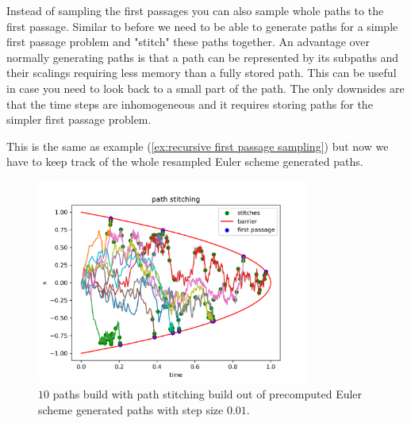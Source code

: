 \documentclass[a4paper,12pt]{article}
\begin{document}
\begin{technique}
    Instead of sampling the first passages you can also sample
    whole paths to the first passage. Similar to before we need to be
    able to generate paths for a simple first passage problem and "stitch"
    these paths together. An advantage over normally generating paths
    is that a path can be represented by its subpaths and their scalings
    requiring less memory than a fully stored path. This can be useful
    in case you need to look back to a small part of the path.
    The only downsides are that the time steps are inhomogeneous
    and it requires storing paths for the simpler first passage problem.
\end{technique}

\begin{example}
    This is the same as example (\ref{ex:recursive first passage sampling}) but now we have
    to keep track of the whole resampled Euler scheme generated paths.

    \begin{figure}[h!]
        \centering
        \includegraphics[width=0.8\textwidth]{plots/path stitching para.png}
        \caption{ $10$ paths build with path stitching build out of
            precomputed Euler scheme generated paths with step size $0.01$.}
        \label{fig:path stitching para}
    \end{figure}
\end{example}


\end{document}
